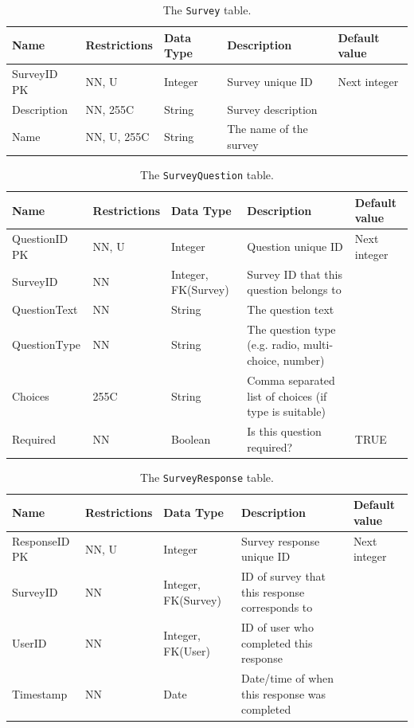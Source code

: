 \documentclass[a4paper, 11pt, titlepage]{article}
\begin{document}
\begin{table}[H]
  \centering
  \caption{The \texttt{Survey} table.}
    \begin{tabularx}{\textwidth}{lllXl}
    \hline
    Name  & Restrictions & Data Type & Description & Default value \\
    \hline
    SurveyID PK & NN, U & Integer & Survey unique ID & Next integer \\
    Description & NN, 255C & String & Survey description &  \\
    Name  & NN, U, 255C & String & The name of the survey &  \\
    \hline
    \end{tabularx}%
  \label{tab:dd:Survey}%
\end{table}%


\begin{table}[H]
  \centering
  \caption{The \texttt{SurveyQuestion} table.}
    \begin{tabularx}{\textwidth}{llp{2.5cm}Xl}
    \hline
    Name  & Restrictions & Data Type & Description & Default value \\
    \hline
    QuestionID PK & NN, U & Integer & Question unique ID & Next integer \\
    SurveyID & NN    & Integer, FK(Survey) & Survey ID that this question belongs to &  \\
    QuestionText & NN    & String & The question text &  \\
    QuestionType & NN    & String & The question type (e.g. radio, multi-choice, number) &  \\
    Choices & 255C  & String & Comma separated list of choices (if type is suitable) &  \\
    Required & NN    & Boolean & Is this question required? & TRUE \\
    \hline
    \end{tabularx}%
  \label{tab:dd:SurveyQuestion}%
\end{table}%


\begin{table}[H]
  \centering
  \caption{The \texttt{SurveyResponse} table.}
    \begin{tabularx}{\textwidth}{llp{2.5cm}Xl}
    \hline
    Name  & Restrictions & Data Type & Description & Default value \\
    \hline
    ResponseID PK & NN, U & Integer & Survey response unique ID & Next integer \\
    SurveyID & NN    & Integer, FK(Survey) & ID of survey that this response corresponds to &  \\
    UserID & NN    & Integer, FK(User) & ID of user who completed this response &  \\
    Timestamp & NN    & Date  & Date/time of when this response was completed &  \\
    \hline
    \end{tabularx}%
  \label{tab:dd:SurveyResponse}%
\end{table}%
\end{document}
